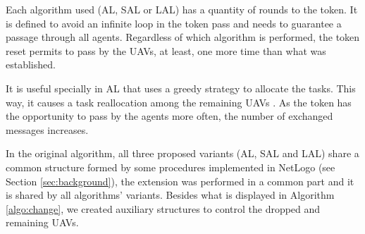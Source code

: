 Each algorithm used (AL, SAL or LAL) has a quantity of rounds to the token. It is defined to avoid an infinite loop in the token pass and needs to guarantee a passage through all agents. Regardless of which algorithm is performed, the token reset permits to pass by the UAVs, at least, one more time than what was established. 

It is useful specially in AL that uses a greedy strategy to allocate the tasks. This way, it causes a task reallocation among the remaining UAVs . As the token has the opportunity to pass by the agents more often, the number of exchanged messages increases.

In the original algorithm, all three proposed variants (AL, SAL and LAL) share a common structure formed by some procedures implemented in NetLogo (see Section \ref{sec:background}), the extension was performed in a common part and it is shared by all algorithms' variants. Besides what is displayed in Algorithm \ref{algo:change}, we created auxiliary structures to control the dropped and remaining UAVs.
